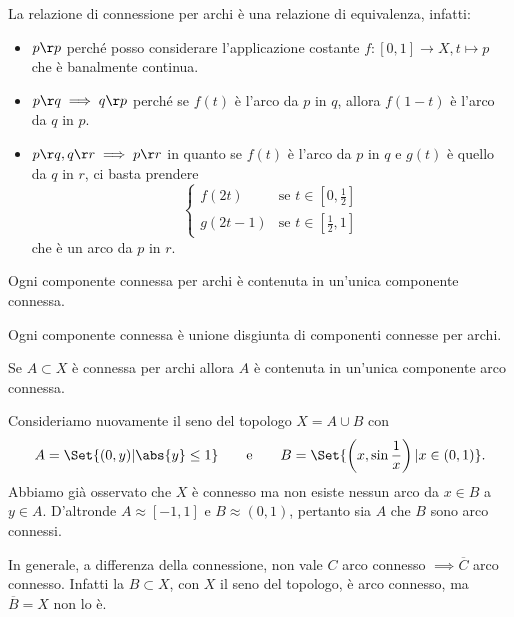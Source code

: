 \begin{oss}
	La relazione di connessione per archi è una relazione di equivalenza, infatti:
	\begin{itemize}
		\item \(p\r p\) perché posso considerare l'applicazione costante \(f\colon [0,1]\to X,t\mapsto p\) che è banalmente continua.
		\item \(p\r q\implies q\r p\) perché se \(f(t)\) è l'arco da \(p\) in \(q\), allora \(f(1-t)\) è l'arco da \(q\) in \(p\).
		\item \(p\r q, q\r r\implies p\r r\) in quanto se \(f(t)\) è l'arco da \(p\) in \(q\) e \(g(t)\) è quello da \(q\) in \(r\), ci basta prendere
		      \[
			      \begin{cases}
				      f(2t)   & \text{se }t\in \left[ 0,\frac{1}{2} \right] \\
				      g(2t-1) & \text{se }t\in \left[ \frac{1}{2},1 \right]
			      \end{cases}
		      \]
		      che è un arco da \(p\) in \(r\).
	\end{itemize}
\end{oss}
%
%
\begin{pr}\label{pr:compConn3}
	Ogni componente connessa per archi è contenuta in un'unica componente connessa.
\end{pr}

\begin{pr}\label{pr:compConn4}
	Ogni componente connessa è unione disgiunta di componenti connesse per archi.
\end{pr}

\begin{pr}\label{pr:compConn5}
	Se \(A\subset X\) è connessa per archi allora \(A\) è contenuta in un'unica componente arco connessa.
\end{pr}

\begin{ese}
	Consideriamo nuovamente il seno del topologo \(X=A\cup B\) con
	\[
		A=\Set{(0,y) | \abs{y} \le 1} \qquad\text{e}\qquad B=\Set{\left(x,\sin \frac{1}{x}\right) | x\in (0,1)}.
	\]
	Abbiamo già osservato che \(X\) è connesso ma non esiste nessun arco da \(x\in B\) a \(y\in A\).
	D'altronde \(A\approx [-1,1]\) e \(B\approx (0,1)\), pertanto sia \(A\) che \(B\) sono arco connessi.
\end{ese}

\begin{oss}
	In generale, a differenza della connessione, non vale \(C\) arco connesso \(\implies \overline{C}\) arco connesso.
	Infatti la \(B\subset X\), con \(X\) il seno del topologo, è arco connesso, ma \(\overline{B}=X\) non lo è.
\end{oss}


